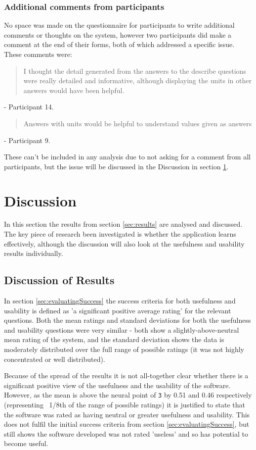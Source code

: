 \documentclass[authoryearcitations]{UoYCSproject}
\begin{document}
\subsection{Additional comments from participants}
\label{subsec:resultsComments}

No space was made on the questionnaire for participants to write additional comments or thoughts on the system, however two participants did make a comment at the end of their forms, both of which addressed a specific issue. These comments were:

\blockquote{I thought the detail generated from the answers to the describe questions were really detailed and informative, although displaying the units in other answers would have been helpful.} - Participant 14.

\blockquote{Answers with units would be helpful to understand values given as answers} - Participant 9.

These can't be included in any analysis due to not asking for a comment from all participants, but the issue will be discussed in the Discussion in section \ref{sec:discussion}.

\newpage
\chapter{Discussion}
\label{sec:discussion}

In this section the results from section \ref{sec:results} are analysed and discussed. The key piece of research been investigated is whether the application learns effectively, although the discussion will also look at the usefulness and usability results individually.

\section{Discussion of Results}
\label{sec:disResults}
In section \ref{sec:evaluatingSuccess} the success criteria for both usefulness and usability is defined as 'a significant positive average rating' for the relevant questions. Both the mean ratings and standard deviations for both the usefulness and usability questions were very similar - both show a slightly-above-neutral mean rating of the system, and the standard deviation shows the data is moderately distributed over the full range of possible ratings (it was not highly concentrated or well distributed).

Because of the spread of the results it is not all-together clear whether there is a significant positive view of the usefulness and the usability of the software. However, as the mean is above the neural point of \texttt{3} by 0.51 and 0.46 respectively (representing ~1/8th of the range of possible ratings) it is justified to state that the software was rated as having neutral or greater usefulness and usability. This does not fulfil the initial success criteria from section \ref{sec:evaluatingSuccess}, but still shows the software developed was not rated 'useless' and so has potential to become useful.
\end{document}
